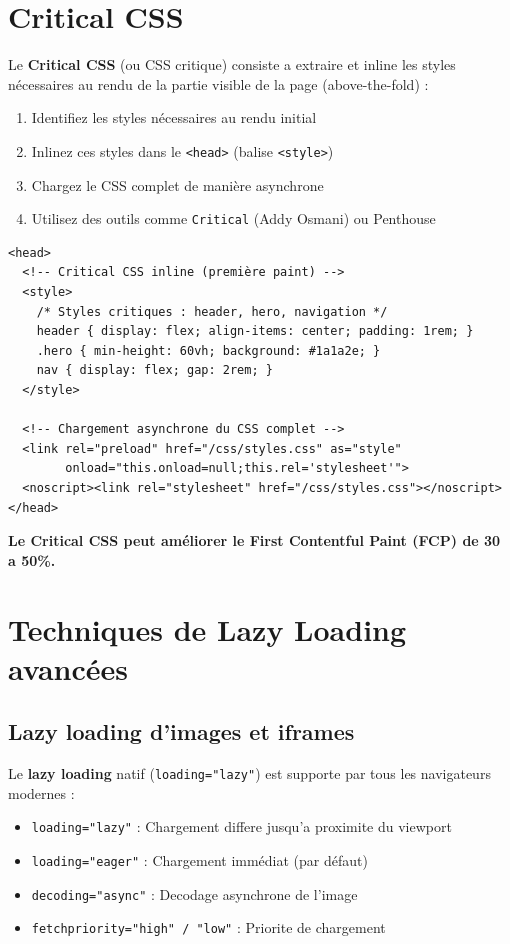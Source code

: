 \documentclass[12pt,a4paper,twoside]{report}
\newcommand{\keyword}[1]{\textbf{\textcolor{googleblue}{#1}}}
\newcommand{\important}[1]{\textbf{\textcolor{googlered}{#1}}}
\begin{document}
\section{Critical CSS}

Le \keyword{Critical CSS} (ou CSS critique) consiste a extraire et inline les styles nécessaires au rendu de la partie visible de la page (above-the-fold) :

\begin{enumerate}
    \item Identifiez les styles nécessaires au rendu initial
    \item Inlinez ces styles dans le \texttt{<head>} (balise \texttt{<style>})
    \item Chargez le CSS complet de manière asynchrone
    \item Utilisez des outils comme \texttt{Critical} (Addy Osmani) ou Penthouse
\end{enumerate}

\begin{lstlisting}[style=htmlcode,caption={Critical CSS inline + chargement asynchrone}]
<head>
  <!-- Critical CSS inline (première paint) -->
  <style>
    /* Styles critiques : header, hero, navigation */
    header { display: flex; align-items: center; padding: 1rem; }
    .hero { min-height: 60vh; background: #1a1a2e; }
    nav { display: flex; gap: 2rem; }
  </style>

  <!-- Chargement asynchrone du CSS complet -->
  <link rel="preload" href="/css/styles.css" as="style"
        onload="this.onload=null;this.rel='stylesheet'">
  <noscript><link rel="stylesheet" href="/css/styles.css"></noscript>
</head>
\end{lstlisting}

\important{Le Critical CSS peut améliorer le First Contentful Paint (FCP) de 30 a 50\%.}

\section{Techniques de Lazy Loading avancées}

\subsection{Lazy loading d'images et iframes}

Le \keyword{lazy loading} natif (\texttt{loading="lazy"}) est supporte par tous les navigateurs modernes :

\begin{itemize}
    \item \texttt{loading="lazy"} : Chargement differe jusqu'a proximite du viewport
    \item \texttt{loading="eager"} : Chargement immédiat (par défaut)
    \item \texttt{decoding="async"} : Decodage asynchrone de l'image
    \item \texttt{fetchpriority="high" / "low"} : Priorite de chargement
\end{itemize}
\end{document}
